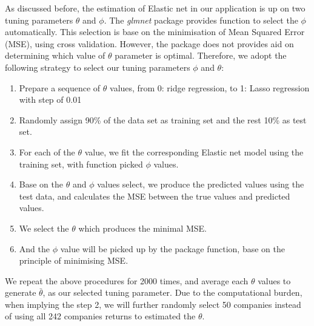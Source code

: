 As discussed before, the estimation of Elastic net in our application is up on two tuning parameters $\theta$ and $\phi$.
The \textit{glmnet} package provides function to select the $\phi$ automatically. 
This selection is base on the minimisation of Mean Squared Error (MSE), using cross validation.
However, the package does not provides aid on determining which value of $\theta$ parameter is optimal.
Therefore, we adopt the following strategy to select our tuning parameters $\phi$  and $\theta$:
\begin{enumerate}
\item Prepare a sequence of $\theta$ values, from 0: ridge regression, to 1: Lasso regression with step of 0.01
\item Randomly assign 90\% of the data set as training set and the rest 10\% as test set. 
\item For each of the $\theta$ value, we fit the corresponding Elastic net model using the training set, with function picked $\phi$ values.
\item Base on the $\theta$ and $\phi$ values select, we produce the predicted values using the test data, and calculates the MSE between the true values and predicted values.
\item We select the $\theta$ which produces the minimal MSE.
\item And the $\phi$ value will be picked up by the package function, base on the principle of minimising MSE.
\end{enumerate}
We repeat the above procedures for 2000 times, and average each $\theta$ values to generate $\bar{\theta}$, as our selected tuning parameter.
Due to the computational burden, when implying the step 2, we will further randomly select 50 companies instead of using all 242 companies returns to estimated the $\theta$.

